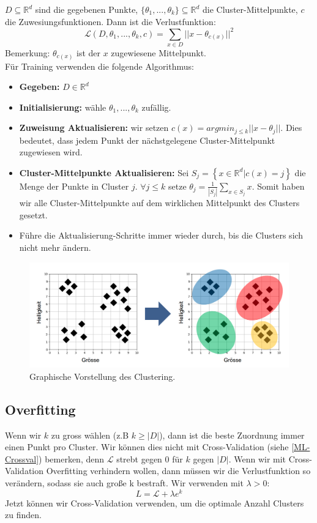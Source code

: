 $D \subseteq \mathbb{R}^d$ sind die gegebenen Punkte,  $\{\theta_1,...,\theta_k\} \subseteq \mathbb{R}^d$ die Cluster-Mittelpunkte, $c$ die Zuwesiungsfunktionen. Dann ist die Verlustfunktion: 
\begin{equation}
    \mathcal{L}(D,\theta_1,...,\theta_k,c) = \sum_{x \in D} || x - \theta_{c(x)}||^2 
\end{equation}
Bemerkung: $\theta_{c(x)}$ ist der  $x$ zugewiesene Mittelpunkt.\\

Für Training verwenden die folgende Algorithmus:

\begin{itemize}
    \item \textbf{Gegeben: } $D \in \mathbb{R}^d$
    \item \textbf{Initialisierung: } wähle $\theta_1,...,\theta_k$ zufällig. 
    \item \textbf{Zuweisung Aktualisieren: } wir setzen $c(x) = argmin_{j \leq k} || x -\theta_j||$. Dies bedeutet, dass jedem Punkt der nächstgelegene Cluster-Mittelpunkt zugewiesen wird.
    \item \textbf{Cluster-Mittelpunkte Aktualisieren: } Sei $S_j = \left\{ x \in \mathbb{R}^d | c(x) = j\right\}$ die Menge der Punkte in Cluster $j$. $\forall j \leq k$ setze $\theta_j = \frac{1}{|S_j|} \sum_{x \in S_j} x$. Somit haben wir alle Cluster-Mittelpunkte auf dem wirklichen Mittelpunkt des Clusters gesetzt.
    \item Führe die Aktualisierung-Schritte immer wieder durch, bis die Clusters sich nicht mehr ändern. 
\end{itemize}
\begin{figure}
    \centering
    \includegraphics[scale=0.3]{Figures/ML-Clustering.png}
    \caption{Graphische Vorstellung des Clustering.}
\end{figure}
\subsection{Overfitting}
Wenn wir $k$ zu gross wählen (z.B  $k \geq |D|$), dann ist die beste Zuordnung immer einen Punkt pro Cluster. Wir können dies  nicht mit Cross-Validation (siehe \ref{ML-Crossval}) bemerken, denn $\mathcal{L}$ strebt gegen 0 für $k$ gegen $|D|$. Wenn wir mit Cross-Validation Overfitting verhindern wollen, dann müssen wir die Verlustfunktion so verändern, sodass sie auch große k bestraft. Wir verwenden mit $\lambda > 0$:
\begin{equation}
    L = \mathcal{L} + \lambda e^k
\end{equation}
Jetzt können wir Cross-Validation verwenden, um die optimale Anzahl Clusters zu finden. 


